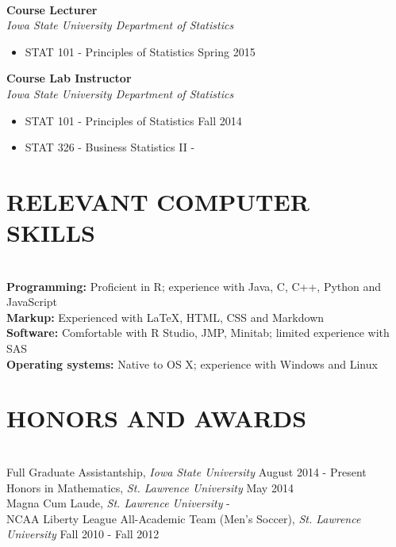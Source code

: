 \documentclass[10pt]{res} %
\begin{document}
\begin{CJK*}{UTF8}{gbsn}
\begin{resume}
\hrulefill \\
{\bf Course Lecturer} \\
{\sl Iowa State University Department of Statistics}
\begin{itemize} \itemsep -2pt
\item STAT 101 - Principles of Statistics \hfill Spring 2015
\end{itemize}

{\bf Course Lab Instructor} \\
{\sl Iowa State University Department of Statistics}
\begin{itemize} \itemsep -2pt 
\item STAT 101 - Principles of Statistics \hfill Fall 2014
\item STAT 326 - Business Statistics II \hfill -
\end{itemize}

\newpage
\section{RELEVANT COMPUTER SKILLS}

\hrulefill \\
{\bf Programming:} Proficient in R; experience with Java, C, C++, Python and JavaScript \\
{\bf Markup:} Experienced with \LaTeX, HTML, CSS and Markdown \\
{\bf Software:} Comfortable with R Studio, JMP, Minitab; limited experience with SAS \\
{\bf Operating systems:} Native to OS X; experience with Windows and Linux


\section{HONORS AND AWARDS}

\hrulefill \\
Full Graduate Assistantship, {\sl Iowa State University} \hfill August 2014 - Present \\
Honors in Mathematics, {\sl St. Lawrence University} \hfill May 2014 \\
Magna Cum Laude, {\sl St. Lawrence University} \hfill - \\
NCAA Liberty League All-Academic Team (Men's Soccer), {\sl St. Lawrence University} \hfill Fall 2010 - Fall 2012


\end{resume}
\end{CJK*}
\end{document}

